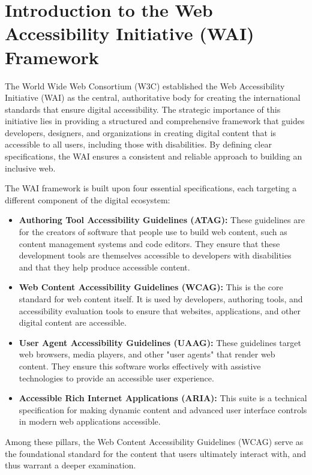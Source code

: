 \documentclass{scrbook}
\begin{document}
\chapter{Introduction to the Web Accessibility Initiative (WAI) Framework}

The World Wide Web Consortium (W3C) established the Web Accessibility Initiative (WAI) as the central, authoritative body for creating the international standards that ensure digital accessibility. The strategic importance of this initiative lies in providing a structured and comprehensive framework that guides developers, designers, and organizations in creating digital content that is accessible to all users, including those with disabilities. By defining clear specifications, the WAI ensures a consistent and reliable approach to building an inclusive web.

The WAI framework is built upon four essential specifications, each targeting a different component of the digital ecosystem:

\begin{itemize}
    \item \textbf{Authoring Tool Accessibility Guidelines (ATAG):} These guidelines are for the creators of software that people use to build web content, such as content management systems and code editors. They ensure that these development tools are themselves accessible to developers with disabilities and that they help produce accessible content.
    \item \textbf{Web Content Accessibility Guidelines (WCAG):} This is the core standard for web content itself. It is used by developers, authoring tools, and accessibility evaluation tools to ensure that websites, applications, and other digital content are accessible.
    \item \textbf{User Agent Accessibility Guidelines (UAAG):} These guidelines target web browsers, media players, and other "user agents" that render web content. They ensure this software works effectively with assistive technologies to provide an accessible user experience.
    \item \textbf{Accessible Rich Internet Applications (ARIA):} This suite is a technical specification for making dynamic content and advanced user interface controls in modern web applications accessible.
\end{itemize}

Among these pillars, the Web Content Accessibility Guidelines (WCAG) serve as the foundational standard for the content that users ultimately interact with, and thus warrant a deeper examination.
\end{document}
